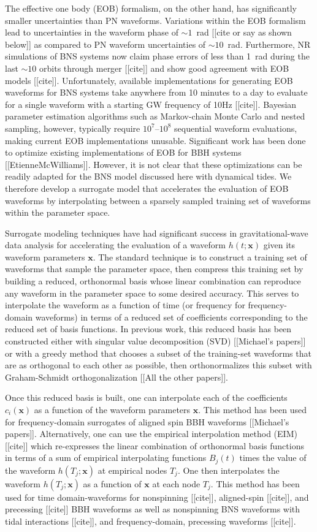 \documentclass[prd,aps,letter,twocolumn,floatfix,notitlepage,nofootinbib]{revtex4-1}
\def\bx{\mathbf{x}}
\begin{document}
The effective one body (EOB) formalism, on the other hand, has significantly smaller uncertainties than PN waveforms. Variations within the EOB formalism lead to uncertainties in the waveform phase of $\sim 1$~rad [[cite or say as shown below]] as compared to PN waveform uncertainties of $\sim 10$~rad. Furthermore, NR simulations of BNS systems now claim phase errors of less than 1~rad during the last $\sim 10$ orbits through merger [[cite]] and show good agreement with EOB models [[cite]]. Unfortunately, available implementations for generating EOB waveforms for BNS systems take anywhere from 10 minutes to a day to evaluate for a single waveform with a starting GW frequency of 10Hz [[cite]]. Bayesian parameter estimation algorithms such as Markov-chain Monte Carlo and nested sampling, however, typically require $10^7$--$10^8$ sequential waveform evaluations, making current EOB implementations unusable. Significant work has been done to optimize existing implementations of EOB for BBH systems [[EtienneMcWilliams]]. However, it is not clear that these optimizations can be readily adapted for the BNS model discussed here with dynamical tides. We therefore develop a surrogate model that accelerates the evaluation of EOB waveforms by interpolating between a sparsely sampled training set of waveforms within the parameter space. 

Surrogate modeling techniques have had significant success in gravitational-wave data analysis for accelerating the evaluation of a waveform $h(t;\bx)$ given its waveform parameters $\bx$. The standard technique is to construct a training set of waveforms that sample the parameter space, then compress this training set by building a reduced, orthonormal basis whose linear combination can reproduce any waveform in the parameter space to some desired accuracy. This serves to interpolate the waveform as a function of time (or frequency for frequency-domain waveforms) in terms of a reduced set of coefficients corresponding to the reduced set of basis functions. In previous work, this reduced basis has been constructed either with singular value decomposition (SVD) [[Michael's papers]] or with a greedy method that chooses a subset of the training-set waveforms that are as orthogonal to each other as possible, then orthonormalizes this subset with Graham-Schmidt orthogonalization [[All the other papers]].

Once this reduced basis is built, one can interpolate each of the coefficients $c_i(\bx)$ as a function of the waveform parameters $\bx$. This method has been used for frequency-domain surrogates of aligned spin BBH waveforms [[Michael's papers]]. Alternatively, one can use the empirical interpolation method (EIM) [[cite]] which re-expresses the linear combination of orthonormal basis functions in terms of a sum of empirical interpolating functions $B_j(t)$ times the value of the waveform $h(T_j; \bx)$ at empirical nodes $T_j$. One then interpolates the waveform $h(T_j; \bx)$ as a function of $\bx$ at each node $T_j$. This method has been used for time domain-waveforms for nonspinning [[cite]], aligned-spin [[cite]], and precessing [[cite]] BBH waveforms as well as nonspinning BNS waveforms with tidal interactions [[cite]], and frequency-domain, precessing waveforms [[cite]].
\end{document}
